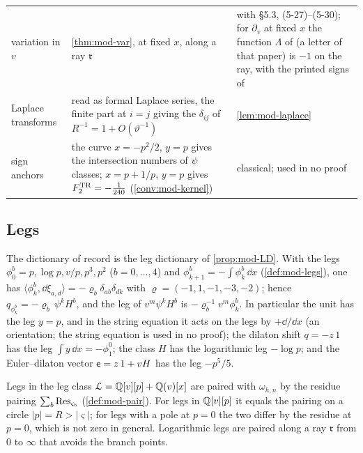 \begin{table}[ht]
\begin{tabular}{@{}>{\raggedright\arraybackslash}p{}>{\raggedright\arraybackslash}p{}>{\raggedright\arraybackslash}p{}@{}}
variation in $v$ & \cref{thm:mod-var}, at fixed $x$, along a ray $\mathfrak r$ & \cite[Theorem~5.1, (5-14)--(5-15)]{Eynard:2007kz} with \S5.3, (5-27)--(5-30); for $\partial_v$ at fixed $x$ the function $\Lambda$ of \cite[(5-13)]{Eynard:2007kz} (a letter of that paper) is $-1$ on the ray, with the printed signs of \cite[(5-1), (5-13)]{Eynard:2007kz} \\
Laplace transforms & \cite[(2-31), (2-32)]{Dunin-Barkowski:2015caa} read as formal Laplace series, the finite part at $i=j$ giving the $\delta_{ij}$ of $R^{-1}=1+O(\vartheta^{-1})$ & \cref{lem:mod-laplace} \\
sign anchors & the curve $x=-p^2/2$, $y=p$ gives the intersection numbers of $\psi$ classes; $x=p+1/p$, $y=p$ gives $F^{\mathrm{TR}}_2=-\frac1{240}$ (\cref{conv:mod-kernel}) & classical; used in no proof \\
\hline
\end{tabular}
\end{table}

\subsection{Legs}
\label{sec:sgn-legs}

The dictionary of record is the leg dictionary of \cref{prop:mod-LD}. With the legs $\phi^b_0=p,\log p,v/p,p^3,p^2$ ($b=0,\dots,4$) and $\phi^b_{k+1}=-\int\phi^b_k\,\dd x$ (\cref{def:mod-legs}), one has $\langle\phi^b_k,\dd\xi_{a,d}\rangle=-\varrho_b\delta_{ab}\delta_{dk}$ with $\varrho=(-1,1,-1,-3,-2)$; hence $q_{\phi^b_k}=-\varrho_b\,\psi^kH^b$, and the leg of $v^m\psi^kH^b$ is $-\varrho_b^{-1}v^m\phi^b_k$. In particular the unit has the leg $y=p$, and in the string equation it acts on the legs by $+\dd/\dd x$ (an orientation; the string equation is used in no proof); the dilaton shift $q=-z\,1$ has the leg $\int y\,\dd x=-\phi^0_1$; the class $H$ has the logarithmic leg $-\log p$; and the Euler--dilaton vector $\mathsf{e}=z\,1+vH$ has the leg $-p^5/5$.

Legs in the leg class $\mathcal{L}=\mathbb{Q}[v][p]+\mathbb{Q}(v)[x]$ are paired with $\omega_{h,n}$ by the residue pairing $\sum_b\operatorname*{Res}_{\varsigma_b}$ (\cref{def:mod-pair}). For legs in $\mathbb{Q}[v][p]$ it equals the pairing on a circle $|p|=R>|\varsigma|$; for legs with a pole at $p=0$ the two differ by the residue at $p=0$, which is not zero in general. Logarithmic legs are paired along a ray $\mathfrak r$ from $0$ to $\infty$ that avoids the branch points.

